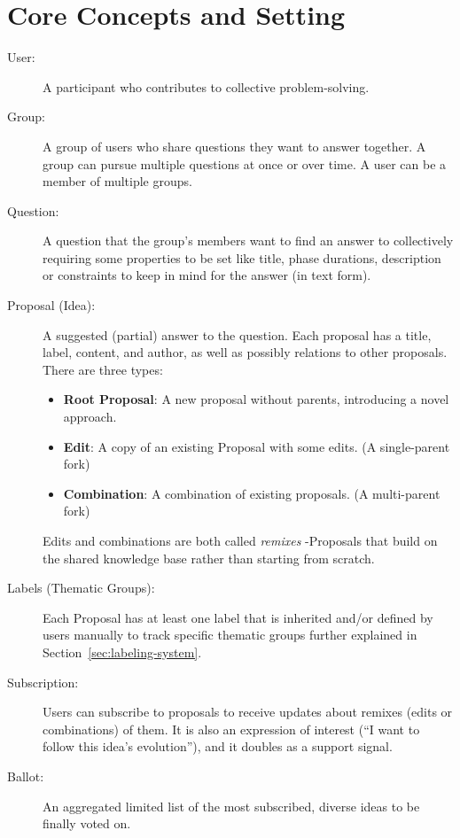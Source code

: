 \documentclass[a4paper, 12pt, twoside]{iviathesis}
\begin{document}
\section{Core Concepts and Setting}

\begin{description}
    \item[User:] A participant who contributes to collective problem-solving.
    \item[Group:] A group of users who share questions they want to answer together. A group can pursue multiple questions at once or over time. A user can be a member of multiple groups.  
    \item[Question:] A question that the group's members want to find an answer to collectively requiring some properties to be set like title, phase durations, description or constraints to keep in mind for the answer (in text form).
    \item[Proposal (Idea):] A suggested (partial) answer to the question. Each proposal has a title, label, content, and author, as well as possibly relations to other proposals. There are three types:
    \begin{itemize}
        \item \textbf{Root Proposal}: A new proposal without parents, introducing a novel approach.
        \item \textbf{Edit}: A copy of an existing Proposal with some edits. (A single-parent fork)
        \item \textbf{Combination}: A combination of existing proposals. (A multi-parent fork)
    \end{itemize}
    Edits and combinations are both called \textit{remixes} -Proposals that build on the shared knowledge base rather than starting from scratch.
    \item[Labels (Thematic Groups):] Each Proposal has at least one label that is inherited and/or defined by users manually to track specific thematic groups further explained in Section~\ref{sec:labeling-system}.
    \item[Subscription:] Users can subscribe to proposals to receive updates about remixes (edits or combinations) of them. It is also an expression of interest (``I want to follow this idea's evolution''), and it doubles as a support signal.
    \item[Ballot:] An aggregated limited list of the most subscribed, diverse ideas to be finally voted on.
\end{description}
\end{document}
